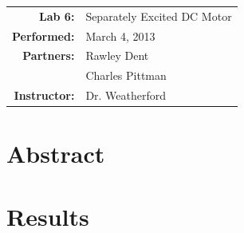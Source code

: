 \documentclass{article}
\begin{document}
\begin{tabular}{rl}
  \textbf{Lab 6:} & Separately Excited DC Motor \\
  \textbf{Performed:} & March 4, 2013 \\
  \textbf{Partners:} & Rawley Dent \\ & Charles Pittman \\
  \textbf{Instructor:} & Dr. Weatherford
\end{tabular}


\section*{Abstract}


\section*{Results}
\end{document}
